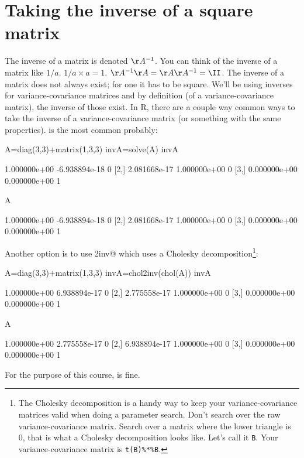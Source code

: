 \section{Taking the inverse of a square matrix}
The inverse of a matrix is denoted $\AA^{-1}$.  You can think of the inverse of a matrix like $1/a$.  $1/a \times a = 1$. $\AA^{-1}\AA = \AA\AA^{-1} = \II$.  The inverse of a matrix does not always exist; for one it has to be square.  We'll be using inverses for variance-covariance matrices and by definition (of a variance-covariance matrix), the inverse of those exist.  In R, there are a couple way common ways to take the inverse of a variance-covariance matrix (or something with the same properties).  \verb@solve@ is the most common probably:
\begin{Schunk}
\begin{Sinput}
 A=diag(3,3)+matrix(1,3,3)
 invA=solve(A)
 invA%*%A
\end{Sinput}
\begin{Soutput}
             [,1]          [,2] [,3]
[1,] 1.000000e+00 -6.938894e-18    0
[2,] 2.081668e-17  1.000000e+00    0
[3,] 0.000000e+00  0.000000e+00    1
\end{Soutput}
\begin{Sinput}
 A%*%invA
\end{Sinput}
\begin{Soutput}
             [,1]          [,2] [,3]
[1,] 1.000000e+00 -6.938894e-18    0
[2,] 2.081668e-17  1.000000e+00    0
[3,] 0.000000e+00  0.000000e+00    1
\end{Soutput}
\end{Schunk}
Another option is to use \verb@chol2inv@ which uses a Cholesky decomposition\footnote{The Cholesky decomposition is a handy way to keep your variance-covariance matrices valid when doing a parameter search.  Don't search over the raw variance-covariance matrix.  Search over a matrix where the lower triangle is 0, that is what a Cholesky decomposition looks like.  Let's call it \texttt{B}. Your variance-covariance matrix is \texttt{t(B)\%*\%B}.}:
\begin{Schunk}
\begin{Sinput}
 A=diag(3,3)+matrix(1,3,3)
 invA=chol2inv(chol(A))
 invA%*%A
\end{Sinput}
\begin{Soutput}
             [,1]         [,2] [,3]
[1,] 1.000000e+00 6.938894e-17    0
[2,] 2.775558e-17 1.000000e+00    0
[3,] 0.000000e+00 0.000000e+00    1
\end{Soutput}
\begin{Sinput}
 A%*%invA
\end{Sinput}
\begin{Soutput}
             [,1]         [,2] [,3]
[1,] 1.000000e+00 2.775558e-17    0
[2,] 6.938894e-17 1.000000e+00    0
[3,] 0.000000e+00 0.000000e+00    1
\end{Soutput}
\end{Schunk}
For the purpose of this course, \verb@solve@ is fine.

